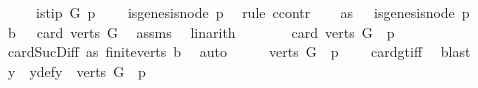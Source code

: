 \begin{isabellebody}
\ \ \ \ \ {\isachardoublequoteopen}is{\isacharunderscore}{\kern0pt}tip\ G\ p{\isachardoublequoteclose}\isanewline
\ \ \ {\isachardoublequoteopen}{\isasymnot}\ is{\isacharunderscore}{\kern0pt}genesis{\isacharunderscore}{\kern0pt}node\ p\ {\isachardoublequoteclose}\isanewline
%
\isadelimproof
%
\endisadelimproof
%
\isatagproof
{}\isamarkupfalse%
\ {\isacharparenleft}{\kern0pt}rule\ ccontr{\isacharparenright}{\kern0pt}\isanewline
\ \ \isamarkupfalse%
\ as{\isacharcolon}{\kern0pt}\ {\isachardoublequoteopen}{\isasymnot}\ {\isasymnot}\ is{\isacharunderscore}{\kern0pt}genesis{\isacharunderscore}{\kern0pt}node\ p{\isachardoublequoteclose}\isanewline
\ \ \isamarkupfalse%
\ b{}{\isacharcolon}{\kern0pt}\ {\isachardoublequoteopen}{}\ {\isacharless}{\kern0pt}\ card\ {\isacharparenleft}{\kern0pt}verts\ G{\isacharparenright}{\kern0pt}{\isachardoublequoteclose}\ \isamarkupfalse%
\ assms\ \isamarkupfalse%
\ linarith\isanewline
\ \ \isamarkupfalse%
\ \isamarkupfalse%
\ {\isachardoublequoteopen}{}\ {\isacharless}{\kern0pt}\ card\ {\isacharparenleft}{\kern0pt}{\isacharparenleft}{\kern0pt}verts\ G{\isacharparenright}{\kern0pt}\ {\isacharminus}{\kern0pt}\ {\isacharbraceleft}{\kern0pt}p{\isacharbraceright}{\kern0pt}{\isacharparenright}{\kern0pt}{\isachardoublequoteclose}\ \isamarkupfalse%
\ card{\isacharunderscore}{\kern0pt}Suc{\isacharunderscore}{\kern0pt}Diff{}\ as\ finite{\isacharunderscore}{\kern0pt}verts\ b{}\ \isamarkupfalse%
\ auto\isanewline
\ \ \isamarkupfalse%
\ \isamarkupfalse%
\ {\isachardoublequoteopen}{\isacharparenleft}{\kern0pt}{\isacharparenleft}{\kern0pt}verts\ G{\isacharparenright}{\kern0pt}\ {\isacharminus}{\kern0pt}\ {\isacharbraceleft}{\kern0pt}p{\isacharbraceright}{\kern0pt}{\isacharparenright}{\kern0pt}\ {\isasymnoteq}\ {\isacharbraceleft}{\kern0pt}{\isacharbraceright}{\kern0pt}{\isachardoublequoteclose}\ \isamarkupfalse%
\ card{\isacharunderscore}{\kern0pt}gt{\isacharunderscore}{\kern0pt}{}{\isacharunderscore}{\kern0pt}iff\ \isamarkupfalse%
\ blast\isanewline
\ \ \isamarkupfalse%
\ \isamarkupfalse%
\ y\ \ y{\isacharunderscore}{\kern0pt}def{\isacharcolon}{\kern0pt}{\isachardoublequoteopen}y\ {\isasymin}\ {\isacharparenleft}{\kern0pt}verts\ G{\isacharparenright}{\kern0pt}\ {\isacharminus}{\kern0pt}\ {\isacharbraceleft}{\kern0pt}p{\isacharbraceright}{\kern0pt}{\isachardoublequoteclose}\ \isamarkupfalse%

\end{isabellebody}
